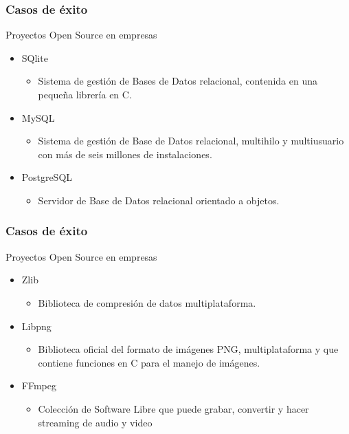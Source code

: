 \frame
{
\frametitle{Casos de éxito}
\Large{Proyectos Open Source en empresas}
\normalsize
\begin{itemize}
	\item SQlite
	\begin{itemize}
		\item Sistema de gestión de Bases de Datos relacional,
			contenida en una pequeña librería en C.
	\end{itemize}
	\item MySQL
	\begin{itemize}
		\item Sistema de gestión de Base de Datos relacional,
			multihilo y multiusuario con más de seis millones de instalaciones.
	\end{itemize}
	\item PostgreSQL
	\begin{itemize}
		\item Servidor de Base de Datos relacional orientado a objetos.
	\end{itemize}
\end{itemize}
}

\frame
{
\frametitle{Casos de éxito}
\Large{Proyectos Open Source en empresas}
\normalsize
\begin{itemize}
	\item Zlib
	\begin{itemize}
		\item Biblioteca de compresión de datos multiplataforma.
	\end{itemize}
	\item Libpng
	\begin{itemize}
		\item Biblioteca oficial del formato de imágenes PNG, multiplataforma
			y que contiene funciones en C para el manejo de imágenes.
	\end{itemize}
	\item FFmpeg
	\begin{itemize}
		\item Colección de Software Libre que puede grabar, convertir y hacer streaming
			de audio y video
	\end{itemize}
\end{itemize}
}

